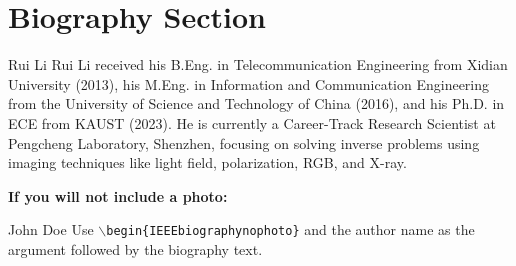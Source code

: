 \documentclass[lettersize,journal]{IEEEtran}
\begin{document}

{
    \small
    
    
}


\newpage

\section{Biography Section}
 

\begin{IEEEbiography}{Rui Li} Rui Li received his B.Eng. in Telecommunication Engineering from Xidian University (2013), his M.Eng. in Information and Communication Engineering from the University of Science and Technology of China (2016), and his Ph.D. in ECE from KAUST (2023). He is currently a Career-Track Research Scientist at Pengcheng Laboratory, Shenzhen, focusing on solving inverse problems using imaging techniques like light field, polarization, RGB, and X-ray.
\end{IEEEbiography}

\vspace{11pt}

\bf{If you will not include a photo:}\vspace{-33pt}
\begin{IEEEbiographynophoto}{John Doe}
Use $\backslash${\tt{begin\{IEEEbiographynophoto\}}} and the author name as the argument followed by the biography text.
\end{IEEEbiographynophoto}




\vfill
\end{document}
